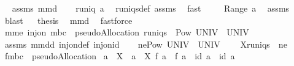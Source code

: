 \begin{isabellebody}
\isadelimproof
\ %
\endisadelimproof
%
\isatagproof
{}\isamarkupfalse%
\ assms\ mm{}{}d\ \isanewline
{}\isamarkupfalse%
\ {\isacharminus}\isanewline
{}\isamarkupfalse%
\ {\isachardoublequoteopen}runiq\ a{\isachardoublequoteclose}\ \isamarkupfalse%
\ runiqs{\isacharunderscore}def\ assms\ \isamarkupfalse%
\ fast\isanewline
{}\isamarkupfalse%
\ \isamarkupfalse%
\ {\isachardoublequoteopen}{\isacharbraceleft}{\isacharbraceright}\ {\isasymnotin}\ Range\ a{\isachardoublequoteclose}\ \isamarkupfalse%
\ assms\ \isamarkupfalse%
\ blast\isanewline
{}\isamarkupfalse%
\ \isamarkupfalse%
\ {\isacharquery}thesis\ \isamarkupfalse%
\ mm{}{}d\ \isamarkupfalse%
\ fastforce\isanewline
{}\isamarkupfalse%
%
\endisatagproof
{\isafoldproof}%
%
\isadelimproof
%
\endisadelimproof
\isanewline
{}\isamarkupfalse%
\ mm{}{}e{\isacharcolon}\ {\isachardoublequoteopen}inj{\isacharunderscore}on\ {\isacharparenleft}mbc\ {\isasymcirc}\ pseudoAllocation{\isacharparenright}\ {\isacharparenleft}runiqs\ {\isasyminter}\ Pow\ {\isacharparenleft}UNIV\ {\isasymtimes}\ {\isacharparenleft}UNIV\ {\isacharminus}\ {\isacharbraceleft}{\isacharbraceleft}{\isacharbraceright}{\isacharbraceright}{\isacharparenright}{\isacharparenright}{\isacharparenright}{\isachardoublequoteclose}\ \isanewline
%
\isadelimproof
%
\endisadelimproof
%
\isatagproof
{}\isamarkupfalse%
\ assms\ mm{}{}dd\ inj{\isacharunderscore}on{\isacharunderscore}def\ inj{\isacharunderscore}on{\isacharunderscore}id\ \isanewline
{}\isamarkupfalse%
\ {\isacharminus}\isanewline
{}\isamarkupfalse%
\ {\isacharquery}ne{\isacharequal}{\isachardoublequoteopen}Pow\ {\isacharparenleft}UNIV\ {\isasymtimes}\ {\isacharparenleft}UNIV\ {\isacharminus}\ {\isacharbraceleft}{\isacharbraceleft}{\isacharbraceright}{\isacharbraceright}{\isacharparenright}{\isacharparenright}{\isachardoublequoteclose}\ \isamarkupfalse%
\ {\isacharquery}X{\isacharequal}{\isachardoublequoteopen}runiqs\ {\isasyminter}\ {\isacharquery}ne{\isachardoublequoteclose}\ \isamarkupfalse%
\ {\isacharquery}f{\isacharequal}{\isachardoublequoteopen}mbc\ {\isasymcirc}\ pseudoAllocation{\isachardoublequoteclose}\isanewline
{}\isamarkupfalse%
\ {\isachardoublequoteopen}{\isasymforall}a{}\ {\isasymin}\ {\isacharquery}X{\isachardot}\ {\isasymforall}\ a{}\ {\isasymin}\ {\isacharquery}X{\isachardot}\ {\isacharquery}f\ a{}\ {\isacharequal}\ {\isacharquery}f\ a{}\ {\isasymlongrightarrow}\ id\ a{}\ {\isacharequal}\ id\ a{}{\isachardoublequoteclose}\ \isamarkupfalse%

\end{isabellebody}

